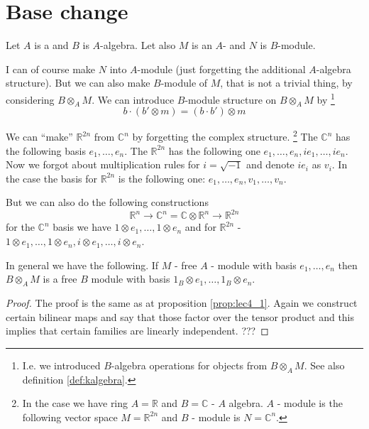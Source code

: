 \section{Base change}

Let $A$ is a  and $B$ is $A$-algebra. Let also $M$
is an $A$- and $N$ is $B$-module.

I can of course make $N$ into $A$-module (just forgetting the
additional $A$-algebra structure). But we can also make $B$-module of
$M$, that is not a trivial thing, by considering $B \otimes_A M$.
We can introduce $B$-module structure on $B \otimes_A M$ by
\footnote{
  I.e. we introduced $B$-algebra operations for objects from
  $B \otimes_A M$. See also definition \ref{def:kalgebra}.
}
\[
b \cdot \left(b' \otimes m \right) = \left( b \cdot b' \right) \otimes m 
\]

\begin{example}
  We can ``make'' $\mathbb{R}^{2n}$ from $\mathbb{C}^n$ by forgetting
  the complex structure.
  \footnote{
    In the case we have ring $A = \mathbb{R}$ and $B = \mathbb{C}$ -
    $A$ algebra. $A$ - module is the following vector space
    $M = \mathbb{R}^{2n}$ and $B$ - module is $N = \mathbb{C}^n$.
  }
  The $\mathbb{C}^n$ has the following basis $e_1, \dots, e_n$.
  The $\mathbb{R}^{2n}$ has the following one
  $e_1, \dots, e_n, i e_1, \dots, i e_n$. Now we forgot about
  multiplication rules for $i = \sqrt{-1}$ and denote $i e_i$ as
  $v_i$. In the case the basis for $\mathbb{R}^{2n}$ is the following
  one: $e_1, \dots, e_n, v_1, \dots, v_n$.

  But we can also do the following constructions
  \[
  \mathbb{R}^n \rightarrow
  \mathbb{C}^n = \mathbb{C} \otimes \mathbb{R}^n \rightarrow
  \mathbb{R}^{2n}
  \]
  for the $\mathbb{C}^n$ basis we have
  $1 \otimes e_1, \dots, 1 \otimes e_n$ and for $\mathbb{R}^{2n}$ -
  $1 \otimes e_1, \dots, 1 \otimes e_n, i \otimes e_1, \dots, i
  \otimes e_n$.
\end{example}

\begin{proposition}
In general we have the following. If $M$ - free $A$ - module with
basis $e_1, \dots, e_n$ then $B \otimes_A M$ is a free $B$ module with
basis $1_B \otimes e_1, \dots, 1_B \otimes e_n$.
\begin{proof}
  The proof is the same as at proposition \ref{prop:lec4_1}. Again we
  construct certain bilinear maps and say that those factor over the
  tensor product and this implies that certain families are linearly
  independent. ???
\end{proof}
\label{prop:lec4_Addon}
\end{proposition}

